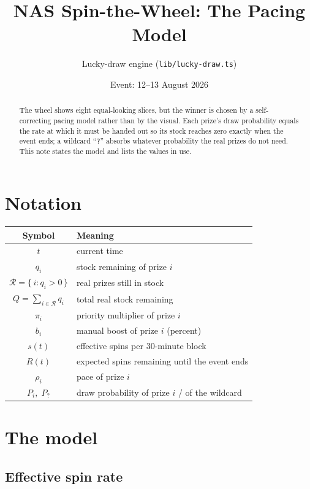 \documentclass[11pt]{article}
\title{\textbf{NAS Spin-the-Wheel: The Pacing Model}}
\author{Lucky-draw engine (\texttt{lib/lucky-draw.ts})}
\date{Event: 12--13 August 2026}
\newcommand{\R}{\mathcal{R}}
\begin{document}
\maketitle

\begin{abstract}
The wheel shows eight equal-looking slices, but the winner is chosen by a
self-correcting pacing model rather than by the visual. Each prize's draw
probability equals the rate at which it must be handed out so its stock reaches
zero exactly when the event ends; a wildcard ``\texttt{?}'' absorbs whatever
probability the real prizes do not need. This note states the model and lists
the values in use.
\end{abstract}

\section{Notation}

\begin{center}
\begin{tabular}{c l}
\toprule
Symbol & Meaning \\
\midrule
$t$ & current time \\
$q_i$ & stock remaining of prize $i$ \\
$\R = \{\, i : q_i > 0 \,\}$ & real prizes still in stock \\
$Q = \sum_{i \in \R} q_i$ & total real stock remaining \\
$\pi_i$ & priority multiplier of prize $i$ \\
$b_i$ & manual boost of prize $i$ (percent) \\
$s(t)$ & effective spins per 30-minute block \\
$R(t)$ & expected spins remaining until the event ends \\
$\rho_i$ & pace of prize $i$ \\
$P_i,\; P_?$ & draw probability of prize $i$ / of the wildcard \\
\bottomrule
\end{tabular}
\end{center}

\section{The model}

\subsection{Effective spin rate}
\end{document}
